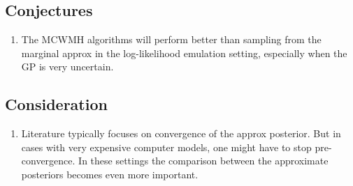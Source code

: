 \documentclass[12pt]{article}
\begin{document}
\subsection{Conjectures}
\begin{enumerate}
\item The MCWMH algorithms will perform better than sampling from the marginal approx in the log-likelihood emulation setting, especially when the GP is very uncertain. 
\end{enumerate}

\subsection{Consideration}
\begin{enumerate}
\item Literature typically focuses on convergence of the approx posterior. But in cases with very expensive computer models, one might have to stop pre-convergence. 
In these settings the comparison between the approximate posteriors becomes even more important. 
\end{enumerate}



 
% 
\end{document}
